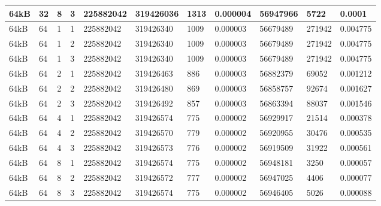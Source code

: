 \documentclass[conference]{IEEEtran}
\begin{document}
\begin{table}
\begin{tabular}{|m{.75cm} |m{.75cm} |m{.8cm} | m{.75cm} | l | l | l | l | l | l | l |}
64kB&	32&	8&	3&	225882042&	319426036&	1313  &	0.000004  &	56947966  &	5722	  &0.0001 \\ \hline
64kB&	64&	1&	1&	225882042&	319426340&	1009  &	0.000003  &	56679489  &	271942	&0.004775 \\ \hline
64kB&	64&	1&	2&	225882042&	319426340&	1009  &	0.000003  &	56679489  &	271942	&0.004775 \\ \hline
64kB&	64&	1&	3&	225882042&	319426340&	1009  &	0.000003  &	56679489  &	271942	&0.004775 \\ \hline
64kB&	64&	2&	1&	225882042&	319426463&	886	  &0.000003	  &56882379	  &69052	  &0.001212 \\ \hline
64kB&	64&	2&	2&	225882042&	319426480&	869	  &0.000003	  &56858757	  &92674	  &0.001627 \\ \hline
64kB&	64&	2&	3&	225882042&	319426492&	857	  &0.000003	  &56863394	  &88037	  &0.001546 \\ \hline
64kB&	64&	4&	1&	225882042&	319426574&	775	  &0.000002	  &56929917	  &21514	  &0.000378 \\ \hline
64kB&	64&	4&	2&	225882042&	319426570&	779	  &0.000002	  &56920955	  &30476	  &0.000535 \\ \hline
64kB&	64&	4&	3&	225882042&	319426573&	776	  &0.000002	  &56919509	  &31922	  &0.000561 \\ \hline
64kB&	64&	8&	1&	225882042&	319426574&	775	  &0.000002	  &56948181	  &3250	    &0.000057 \\ \hline
64kB&	64&	8&	2&	225882042&	319426572&	777	  &0.000002	  &56947025	  &4406	    &0.000077 \\ \hline
64kB&	64&	8&	3&	225882042&	319426574&	775	  &0.000002	  &56946405	  &5026	    &0.000088 \\ \hline
    \end{tabular}
  \end{table}
\end{document}

